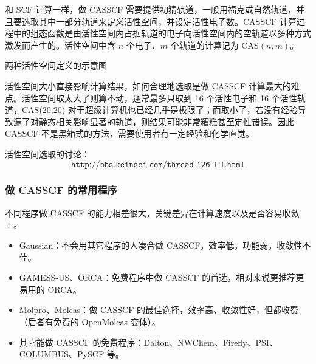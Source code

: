 和 SCF 计算一样，做 CASSCF 需要提供初猜轨道，一般用福克或自然轨道，并且要选取其中一部分轨道来定义活性空间，并设定活性电子数。CASSCF 计算过程中的组态函数是由活性空间内占据轨道的电子向活性空间内的空轨道以多种方式激发而产生的。活性空间中含 $n$ 个电子、$m$ 个轨道的计算记为 CAS$(n,m)$。

\begin{center}
\begin{minipage}{0.92\textwidth}
\centering
两种活性空间定义的示意图

\vspace{0.8em}
\end{minipage}
\end{center}

活性空间大小直接影响计算结果，如何合理地选取是做 CASSCF 计算最大的难点。活性空间取太大了则算不动，通常最多只取到 16 个活性电子和 16 个活性轨道，CAS(20,20) 对于超级计算机也已经几乎是极限了；而取小了，若没有经验导致漏了对静态相关影响显著的轨道，则结果可能非常糟糕甚至定性错误。因此 CASSCF 不是黑箱式的方法，需要使用者有一定经验和化学直觉。

活性空间选取的讨论：
\[
\texttt{http://bbs.keinsci.com/thread-126-1-1.html}
\]

\subsubsection*{做 CASSCF 的常用程序}

不同程序做 CASSCF 的能力相差很大，关键差异在计算速度以及是否容易收敛上。
\begin{itemize}
  \item Gaussian：不会用其它程序的人凑合做 CASSCF，效率低，功能弱，收敛性不佳。
  \item GAMESS-US、ORCA：免费程序中做 CASSCF 的首选，相对来说更推荐更易用的 ORCA。
  \item Molpro、Molcas：做 CASSCF 的最佳选择，效率高、收敛性好，但都收费（后者有免费的 OpenMolcas 变体）。
  \item 其它能做 CASSCF 的免费程序：Dalton、NWChem、Firefly、PSI、COLUMBUS、PySCF 等。
\end{itemize}

